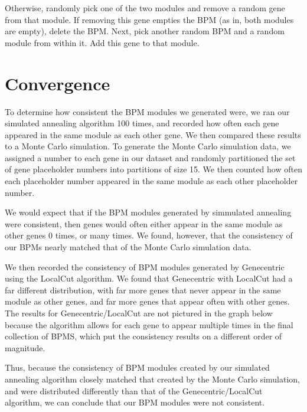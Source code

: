 \documentclass[11pt]{article}
\begin{document}
\par Otherwise, randomly pick one of the two modules and remove a random gene from that module. If removing this gene empties the BPM (as in, both modules are empty), delete the BPM. Next, pick another random BPM and a random module from within it. Add this gene to that module. 

\section{Convergence}
\par To determine how consistent the BPM modules we generated were, we ran our simulated annealing algorithm 100 times, and recorded how often each gene appeared in the same module as each other gene. We then compared these results to a Monte Carlo simulation. To generate the Monte Carlo simulation data, we assigned a number to each gene in our dataset and randomly partitioned the set of gene placeholder numbers into partitions of size 15. We then counted how often each placeholder number appeared in the same module as each other placeholder number. 

\par We would expect that if the BPM modules generated by simmulated annealing were consistent, then genes would often either appear in the same module as other genes 0 times, or many times. We found, however, that the consistency of our BPMs nearly matched that of the Monte Carlo simulation data. 

\par We then recorded the consistency of BPM modules generated by Genecentric using the LocalCut algorithm. We found that Genecentric with LocalCut had a far different distribution, with far more genes that never appear in the same module as other genes, and far more genes that appear often with other genes. The results for Genecentric/LocalCut are not pictured in the graph below because the algorithm allows for each gene to appear multiple times in the final collection of BPMS, which put the consistency results on a different order of magnitude. 

\par Thus, because the consistency of BPM modules created by our simulated annealing algorithm closely matched that created by the Monte Carlo simulation, and were distributed differently than that of the Genecentric/LocalCut algorithm, we can conclude that our BPM modules were not consistent. 
\end{document}
